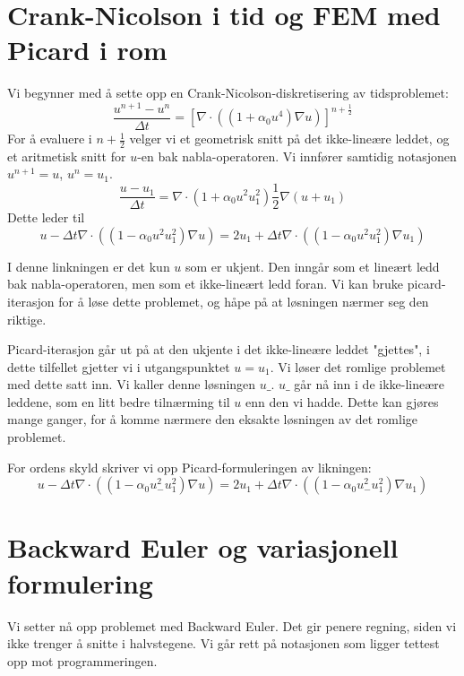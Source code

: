 \documentclass[a4paper, 10pt]{article}
\newcommand{\half}{\frac{1}{2}}
\begin{document}
\section{Crank-Nicolson i tid og FEM med Picard i rom}
Vi begynner med å sette opp en Crank-Nicolson-diskretisering av tidsproblemet:
\begin{equation}
\frac{u^{n+1}- u^n}{\Delta t} = \left[\nabla \cdot ((1+\alpha_0 u^4 )\nabla u)\right]^{n+\half}
\end{equation}
For å evaluere i $n+\half$ velger vi et geometrisk snitt på det ikke-lineære leddet, og et aritmetisk snitt for $u$-en bak nabla-operatoren. Vi innfører samtidig notasjonen $u^{n+1} = u$, $u^n = u_1$.
\begin{equation}
  \frac{u- u_1}{\Delta t} = \nabla \cdot (1+\alpha_0 u^2u^2_1)\half\nabla(u+u_1)
\end{equation}  
Dette leder til 
\begin{equation}
	u - \Delta t \nabla \cdot ((1-\alpha_0u^2u_1^2)\nabla u) = 2u_1 + \Delta t \nabla \cdot((1-\alpha_0u^2u_1^2)\nabla u_1)
\end{equation}

I denne linkningen er det kun $u$ som er ukjent. Den inngår som et lineært ledd bak nabla-operatoren, men som et ikke-lineært ledd foran. Vi kan bruke picard-iterasjon for å løse dette problemet, og håpe på at løsningen nærmer seg den riktige. 

Picard-iterasjon går ut på at den ukjente i det ikke-lineære leddet "gjettes", i dette tilfellet gjetter vi i utgangspunktet $u = u_1$. Vi løser det romlige problemet med dette satt inn. Vi kaller denne løsningen $u\_$. $u\_$ går nå inn i de ikke-lineære leddene, som en litt bedre tilnærming til $u$ enn den vi hadde. Dette kan gjøres mange ganger, for å komme nærmere den eksakte løsningen av det romlige problemet. 

For ordens skyld skriver vi opp Picard-formuleringen av likningen:
\begin{equation}
	u - \Delta t \nabla \cdot ((1-\alpha_0u^2_-u_1^2)\nabla u) = 2u_1 + \Delta t \nabla \cdot((1-\alpha_0u^2_-u_1^2)\nabla u_1)
\end{equation}


\section{Backward Euler og variasjonell formulering}
Vi setter nå opp problemet med Backward Euler. Det gir penere regning, siden vi ikke trenger å snitte i halvstegene. Vi går rett på notasjonen som ligger tettest opp mot programmeringen. 
\end{document}
